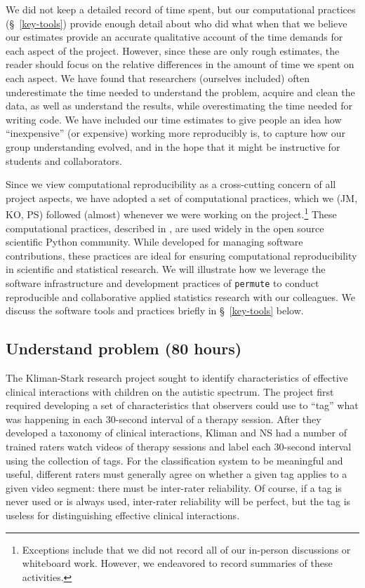 \documentclass[]{article}
\begin{document}
We did not keep a detailed record of time spent, but
our computational practices (\S~\ref{key-tools}) provide enough detail about
who did what when that we believe our estimates provide an accurate qualitative
account of the time demands for each aspect of the project.
However, since these are only rough estimates, the reader should focus on the
relative differences in the amount of time we spent on each aspect.
We have found that researchers (ourselves included) often underestimate the
time needed to understand the problem, acquire and clean the data, as well as
understand the results, while overestimating the time needed for writing code.
We have included our time estimates to give people an idea how ``inexpensive''
(or expensive) working more reproducibly is, to capture how our group
understanding evolved, and in the  hope that it might be instructive for
students and collaborators.

Since we view computational reproducibility as a cross-cutting concern of all
project aspects, we have adopted a set of computational practices, which we
(JM, KO, PS) followed (almost) whenever we were working on the
project.\footnote{Exceptions include that we did not record all of our
in-person discussions or whiteboard work.  
However, we endeavored to
record summaries of these activities.}
These computational practices, described in \citet{millman2014developing},
are used widely in the open source scientific Python community.
While developed for managing software contributions, these practices are ideal
for ensuring computational reproducibility in scientific and statistical
research.
We will illustrate how we leverage the software infrastructure and development
practices of \texttt{permute} to conduct reproducible and collaborative applied
statistics research with our colleagues.
We discuss the software tools and practices briefly in \S~\ref{key-tools} below.

\subsection{Understand problem (80 hours)}
The Kliman-Stark research project sought to identify characteristics of 
effective clinical interactions with children on the autistic spectrum.
The project first required developing a set of characteristics that observers
could use to ``tag'' what was happening in each 30-second interval of a 
therapy session.
After they developed a taxonomy of clinical interactions, Kliman and NS had a 
number of trained raters watch videos of therapy sessions and label each 
30-second interval using the collection of tags.
For the classification system to be meaningful and useful, different
raters must generally agree on whether a given tag applies to a given video segment:
there must be inter-rater reliability.
Of course, if a tag is never used or is always used, inter-rater reliability will be perfect,
but the tag is useless for distinguishing effective clinical interactions.
\end{document}
